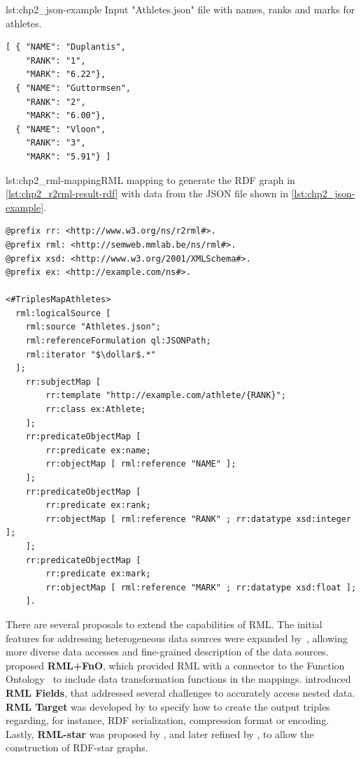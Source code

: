 \begin{minipage}{\textwidth}
\begin{captionedlisting}{lst:chp2_json-example}
{Input "Athletes.json" file with names, ranks and marks for athletes.}
\centering
\begin{lstlisting}[]
[ { "NAME": "Duplantis",
    "RANK": "1",
    "MARK": "6.22"},
  { "NAME": "Guttormsen",
    "RANK": "2",  
    "MARK": "6.00"},
  { "NAME": "Vloon",
    "RANK": "3",
    "MARK": "5.91"} ]
\end{lstlisting}
\end{captionedlisting}
\end{minipage}


\begin{captionedlisting}{lst:chp2_rml-mapping}{RML mapping to generate the RDF graph in \cref{lst:chp2_r2rml-result-rdf} with data from the JSON file shown in \cref{lst:chp2_json-example}.}
\centering
{\begin{lstlisting}[language=r2rml]
@prefix rr: <http://www.w3.org/ns/r2rml#>.
@prefix rml: <http://semweb.mmlab.be/ns/rml#>.
@prefix xsd: <http://www.w3.org/2001/XMLSchema#>.
@prefix ex: <http://example.com/ns#>.

<#TriplesMapAthletes>
  rml:logicalSource [
    rml:source "Athletes.json";
    rml:referenceFormulation ql:JSONPath;
    rml:iterator "$\dollar$.*"
  ];
    rr:subjectMap [
        rr:template "http://example.com/athlete/{RANK}";
        rr:class ex:Athlete;
    ];
    rr:predicateObjectMap [
        rr:predicate ex:name;
        rr:objectMap [ rml:reference "NAME" ];
    ];
    rr:predicateObjectMap [
        rr:predicate ex:rank;
        rr:objectMap [ rml:reference "RANK" ; rr:datatype xsd:integer ];
    ];
    rr:predicateObjectMap [
        rr:predicate ex:mark;
        rr:objectMap [ rml:reference "MARK" ; rr:datatype xsd:float ];
    ].
\end{lstlisting}}
\end{captionedlisting}

There are several proposals to extend the capabilities of RML. The initial features for addressing heterogeneous data sources were expanded by~\cite{Dimou2015Machine}, allowing more diverse data accesses and fine-grained description of the data sources. \cite{DeMeester2017fno_dbpedia} proposed \textbf{RML+FnO}, which provided RML with a connector to the Function Ontology~\parencite{demeester2016fno} to include data transformation functions in the mappings. \cite{delva2021rml-fields} introduced  \textbf{RML Fields}, that addressed several challenges to accurately access nested data. \textbf{RML Target} was developed by \cite{VanAssche2021LeveragingWebThings} to specify how to create the output triples regarding, for instance, RDF serialization, compression format or encoding. Lastly, \textbf{RML-star} was proposed by \cite{delva2021rml-star}, and later refined by \cite{arenas2023morphstar}, to allow the construction of RDF-star graphs. 

